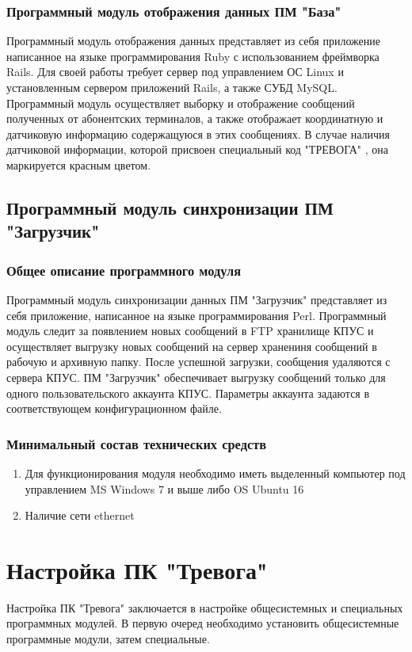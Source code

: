 \documentclass[12pt]{article}[a4paper,14pt,russian]
\begin{document}
	\subsubsection{Программный модуль отображения данных ПМ "База"}

	Программный модуль отображения данных представляет из себя приложение написанное
	на языке программирования Ruby с использованием фреймворка Rails. Для своей работы требует сервер под управлением ОС Linux и установленным сервером приложений Rails, а также СУБД MySQL. Программный модуль осуществляет выборку и отображение сообщений полученных от абонентских терминалов, а также отображает координатную и датчиковую информацию содержащуюся в этих сообщениях. В случае наличия датчиковой информации, которой присвоен специальный код "ТРЕВОГА" , она маркируется красным цветом.
	

	
	\subsection{Программный модуль синхронизации ПМ "Загрузчик"}
	\subsubsection{Общее описание программного модуля}
	Программный модуль синхронизации данных ПМ "Загрузчик"  представляет из себя приложение, написанное на
	языке программирования Perl. Программный модуль следит за появлением новых сообщений в FTP хранилище КПУС и осуществляет выгрузку новых сообщений на сервер хранениня сообщений в рабочую и архивную папку. После успешной загрузки, сообщения удаляются с сервера КПУС. ПМ "Загрузчик" обеспечивает выгрузку сообщений только для одного пользовательского аккаунта КПУС. Параметры аккаунта задаются в соответствующем конфигурационном файле.
	
	\subsubsection{Минимальный состав технических средств}

	\begin{enumerate}
	\item	Для функционирования модуля необходимо иметь выделенный компьютер под управлением
	MS Windows 7 и выше либо OS Ubuntu 16
	\item Наличие сети ethernet
	\end{enumerate}
	\section {Настройка ПК "Тревога"}
	Настройка ПК "Тревога" заключается в настройке общесистемных и специальных программных модулей. В первую очеред необходимо установить общесистемные программные модули, затем специальные. 
\end{document}
